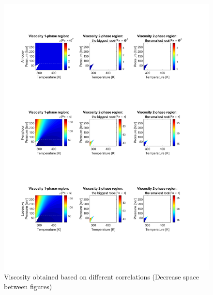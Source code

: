\documentclass[../Article_Model_Parameters.tex]{subfiles}
\begin{document}

        \begin{figure}[H]
			\centering
			\includegraphics[trim = 1.5cm 4.0cm 2.5cm 10.0cm,clip,width=\textwidth]{Figures/MU.pdf}	
			\caption{Viscosity obtained based on different correlations ({\color{red}Decrease space between figures})} 
            \label{fig: SFE_Properties_mu}
		\end{figure} 
			
\end{document}

